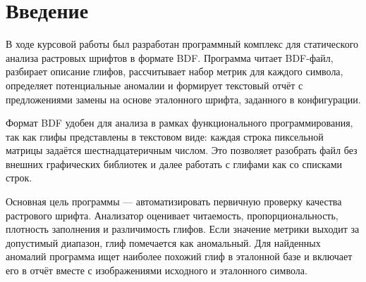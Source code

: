 \section*{Введение}

В ходе курсовой работы был разработан программный комплекс для статического анализа растровых шрифтов в формате BDF. Программа читает BDF-файл, разбирает описание глифов, рассчитывает набор метрик для каждого символа, определяет потенциальные аномалии и формирует текстовый отчёт с предложениями замены на основе эталонного шрифта, заданного в конфигурации.

Формат BDF удобен для анализа в рамках функционального программирования, так как глифы представлены в текстовом виде: каждая строка пиксельной матрицы задаётся шестнадцатеричным числом. Это позволяет разобрать файл без внешних графических библиотек и далее работать с глифами как со списками строк.

Основная цель программы --- автоматизировать первичную проверку качества растрового шрифта. Анализатор оценивает читаемость, пропорциональность, плотность заполнения и различимость глифов. Если значение метрики выходит за допустимый диапазон, глиф помечается как аномальный. Для найденных аномалий программа ищет наиболее похожий глиф в эталонной базе и включает его в отчёт вместе с изображениями исходного и эталонного символа.

\newpage
